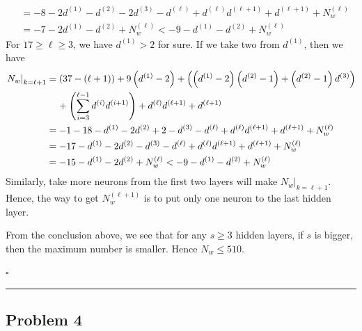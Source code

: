 \documentclass[12pt]{article}
\newcommand*{\QEDB}{\hfill\ensuremath{\square}}
\newcommand{\ParTh}[1]{\left(#1\right)}
\newcommand{\horrule}[1]{\rule{\linewidth}{#1}}
\begin{document}
\begin{enumerate}
\begin{align}
	&=-8-2d^{\ParTh{1}}-d^{\ParTh{2}}-2d^{\ParTh{3}}-d^{\ParTh{\ell}}+d^{\ParTh{\ell}}d^{\ParTh{\ell+1}}+d^{\ParTh{\ell+1}}+N^{\ParTh{\ell}}_w\\
	\label{3-1}
	&=-7-2d^{\ParTh{1}}-d^{\ParTh{2}}+N^{\ParTh{\ell}}_w<-9-d^{\ParTh{1}}-d^{\ParTh{2}}+N^{\ParTh{\ell}}_w
	\end{align}
	For $17\geq\ell\geq3$, we have $d^{\ParTh{1}}>2$ for sure. If we take two from $d^{\ParTh{1}}$, then we have
	\begin{align}
	\nonumber
	\left.N_w\right|_{k=\ell+1}&=\ParTh{37-\ParTh{\ell+1}}+9\ParTh{d^{\ParTh{1}}-2}+\ParTh{\ParTh{d^{\ParTh{1}}-2}\ParTh{d^{\ParTh{2}}-1}+\ParTh{d^{\ParTh{2}}-1}d^{\ParTh{3}}}\\
	&\hspace{4mm}+\ParTh{\sum_{i=3}^{\ell-1}d^{\ParTh{i}}d^{\ParTh{i+1}}}+d^{\ParTh{\ell}}d^{\ParTh{\ell+1}}+d^{\ParTh{\ell+1}}\\
	&=-1-18-d^{\ParTh{1}}-2d^{\ParTh{2}}+2-d^{\ParTh{3}}-d^{\ParTh{\ell}}+d^{\ParTh{\ell}}d^{\ParTh{\ell+1}}+d^{\ParTh{\ell+1}}+N^{\ParTh{\ell}}_w\\
	&=-17-d^{\ParTh{1}}-2d^{\ParTh{2}}-d^{\ParTh{3}}-d^{\ParTh{\ell}}+d^{\ParTh{\ell}}d^{\ParTh{\ell+1}}+d^{\ParTh{\ell+1}}+N^{\ParTh{\ell}}_w\\
	\label{3-1}
	&=-15-d^{\ParTh{1}}-2d^{\ParTh{2}}+N^{\ParTh{\ell}}_w<-9-d^{\ParTh{1}}-d^{\ParTh{2}}+N^{\ParTh{\ell}}_w
	\end{align}
	Similarly, take more neurons from the first two layers will make $\left.N_w\right|_{k=\ell+1}$. Hence, the way to get $N^{\ParTh{\ell+1}}_w$ is to put only one neuron to the last hidden layer.
\end{enumerate}
From the conclusion above, we see that for any $s\geq3$ hidden layers, if $s$ is bigger, then the maximum number is smaller. Hence $N_w\leq510$.

\QEDB

\horrule{0.5pt}

\subsection*{Problem 4}
\end{document}
